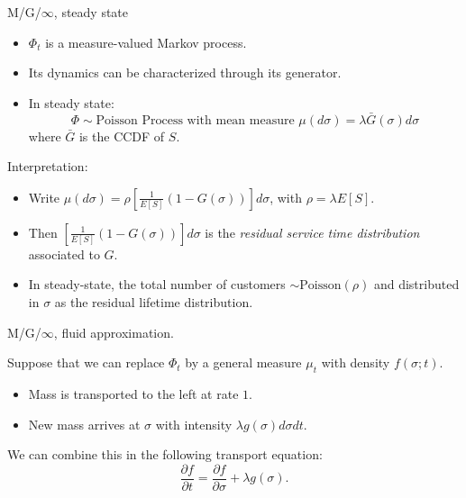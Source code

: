 \documentclass[aspectratio=169]{beamer}
\begin{document}
\begin{frame}{M/G/$\infty$, steady state}
	
	\begin{itemize}
		\item $\Phi_t$ is a measure-valued Markov process.
		\item Its dynamics can be characterized through its generator.
		\item In steady state:
		\begin{equation*}
			\Phi \sim \textrm{Poisson Process with mean measure } \mu(d\sigma) = \lambda \bar{G}(\sigma)d\sigma
		\end{equation*}
		where $\bar{G}$ is the CCDF of $S$.
	\end{itemize}

	\pause
	\vfill
	\alert{Interpretation:}

	\begin{itemize}
	 \item Write $\mu(d\sigma) = \rho \left[\frac{1}{E[S]}(1-G(\sigma))\right]d\sigma$, with $\rho = \lambda E[S]$.
	 \item Then $\left[\frac{1}{E[S]}(1-G(\sigma))\right]d\sigma$ is the \emph{residual service time distribution} associated to $G$.
	 \item In steady-state, the total number of customers $\sim \textrm{Poisson}(\rho)$ and distributed in $\sigma$ as the residual lifetime distribution.
	\end{itemize}

\end{frame}

\begin{frame}{M/G/$\infty$, fluid approximation.}
	
	Suppose that we can replace $\Phi_t$ by a general measure $\mu_t$ with density $f(\sigma;t)$. 
	
	\begin{center}
	\end{center}
	\begin{itemize}
		\item Mass is transported to the left at rate $1$.
		\item New mass arrives at $\sigma$ with intensity $\lambda g(\sigma)d\sigma dt$.
	\end{itemize}
\vfill
	We can combine this in the following \alert{transport equation}:
	\begin{equation*}
		\frac{\partial f}{\partial t} = \frac{\partial f}{\partial \sigma} + \lambda g(\sigma).
	\end{equation*}

\end{frame}
\end{document}
